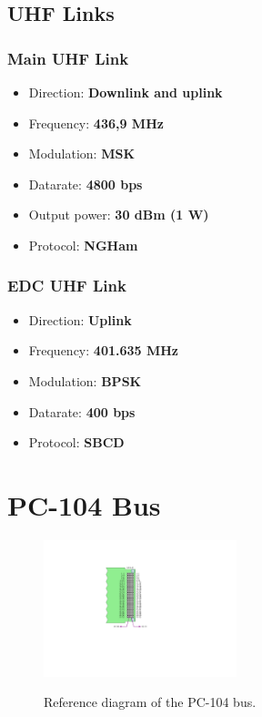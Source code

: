\subsection{UHF Links}

\subsubsection{Main UHF Link}

\begin{itemize}
    \item Direction: \textbf{Downlink and uplink}
    \item Frequency: \textbf{436,9 MHz}
    \item Modulation: \textbf{MSK}
    \item Datarate: \textbf{4800 bps}
    \item Output power: \textbf{30 dBm (1 W)}
    \item Protocol: \textbf{NGHam}
\end{itemize}

\subsubsection{EDC UHF Link}

\begin{itemize}
    \item Direction: \textbf{Uplink}
    \item Frequency: \textbf{401.635 MHz}
    \item Modulation: \textbf{BPSK}
    \item Datarate: \textbf{400 bps}
    \item Protocol: \textbf{SBCD}
\end{itemize}

\section{PC-104 Bus}

\begin{figure}[!ht]
    \begin{center}
        \includegraphics[width=0.5\textwidth]{figures/pc104-diagram}
        \label{fig:pc104-diagram}
        \caption{Reference diagram of the PC-104 bus.}
    \end{center}
\end{figure}

